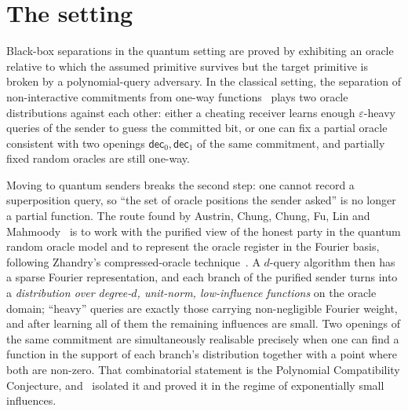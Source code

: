 \documentclass{conjura-conjecture}
\begin{document}
\section{The setting}\label{sec:setting}

Black-box separations in the quantum setting are proved by exhibiting an
oracle relative to which the assumed primitive survives but the target
primitive is broken by a polynomial-query adversary. In the classical
setting, the separation of non-interactive commitments from one-way
functions~\cite{MP12} plays two oracle distributions against each other:
either a cheating receiver learns enough $\varepsilon$-heavy queries of
the sender to guess the committed bit, or one can fix a partial oracle
consistent with two openings $\mathsf{dec}_0,\mathsf{dec}_1$ of the same
commitment, and partially fixed random oracles are still one-way.

Moving to quantum senders breaks the second step: one cannot record a
superposition query, so ``the set of oracle positions the sender asked''
is no longer a partial function. The route found by Austrin, Chung,
Chung, Fu, Lin and Mahmoody~\cite{ACC22} is to work with the purified
view of the honest party in the quantum random oracle model and to
represent the oracle register in the Fourier basis, following Zhandry's
compressed-oracle technique~\cite{Zha19}. A $d$-query algorithm then has
a sparse Fourier representation, and each branch of the purified sender
turns into a \emph{distribution over degree-$d$, unit-norm,
low-influence functions} on the oracle domain; ``heavy'' queries are
exactly those carrying non-negligible Fourier weight, and after learning
all of them the remaining influences are small. Two openings of the same
commitment are simultaneously realisable precisely when one can find a
function in the support of each branch's distribution together with a
point where both are non-zero. That combinatorial statement is the
Polynomial Compatibility Conjecture, and~\cite{ACC22} isolated it and
proved it in the regime of exponentially small influences.
\end{document}
